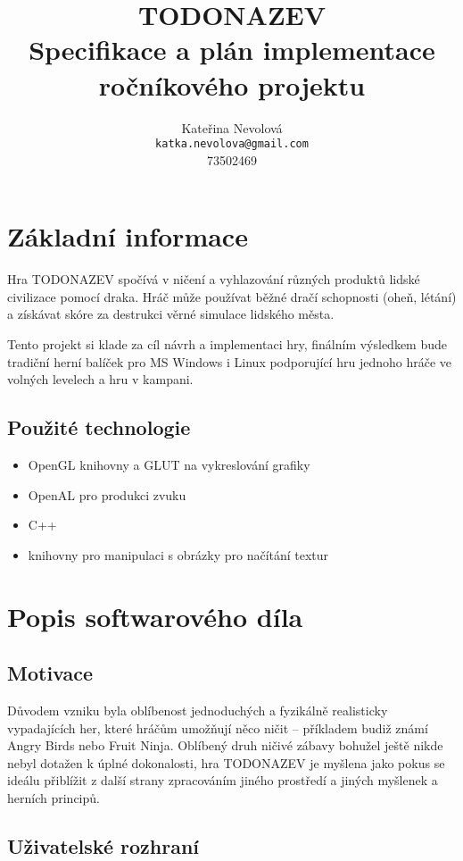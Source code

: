 \documentclass{article}
\title{TODONAZEV \\ Specifikace a plán implementace ročníkového projektu}
\author{Kateřina Nevolová \\ \texttt{katka.nevolova@gmail.com} \\ 73502469}
\begin{document}
\maketitle

\section{Základní informace}
Hra TODONAZEV spočívá v ničení a vyhlazování různých produktů lidské civilizace pomocí draka. Hráč může používat běžné dračí schopnosti (oheň, létání) a získávat skóre za destrukci věrné simulace lidského města.

Tento projekt si klade za cíl návrh a implementaci hry, finálním výsledkem bude tradiční herní balíček pro MS Windows i Linux podporující hru jednoho hráče ve volných levelech a hru v kampani.

\subsection{Použité technologie}

\begin{itemize}
\item OpenGL knihovny a GLUT na vykreslování grafiky
\item OpenAL pro produkci zvuku
\item C++
\item knihovny pro manipulaci s obrázky pro načítání textur
\end{itemize}

\section{Popis softwarového díla}

\subsection{Motivace}
Důvodem vzniku byla oblíbenost jednoduchých a fyzikálně realisticky
vypadajících her, které hráčům umožňují něco ničit -- příkladem budiž známí
Angry Birds nebo Fruit Ninja. Oblíbený druh ničivé zábavy bohužel ještě nikde
nebyl dotažen k úplné dokonalosti, hra TODONAZEV je myšlena jako pokus se
ideálu přiblížit z další strany zpracováním jiného prostředí a jiných myšlenek
a herních principů.

\subsection{Uživatelské rozhraní}
\end{document}
